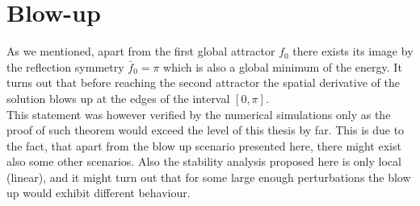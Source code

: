 \section{Blow-up}
\label{sec:blow-up}

As we mentioned, apart from the first global attractor $f_0$ there
exists its image by the reflection symmetry $\bar{f}_0=\pi$ which is
also a global minimum of the energy. It turns out that before reaching
the second attractor the spatial derivative of the solution blows up
at the edges of the interval $[0,\pi]$.\\

This statement was however verified by the numerical simulations only
as the proof of such theorem would exceed the level of this thesis by
far. This is due to the fact, that apart from the blow up scenario
presented here, there might exist also some other scenarios. Also the
stability analysis proposed here is only local (linear), and it might
turn out that for some large enough perturbations the blow up would
exhibit different behaviour.\\

